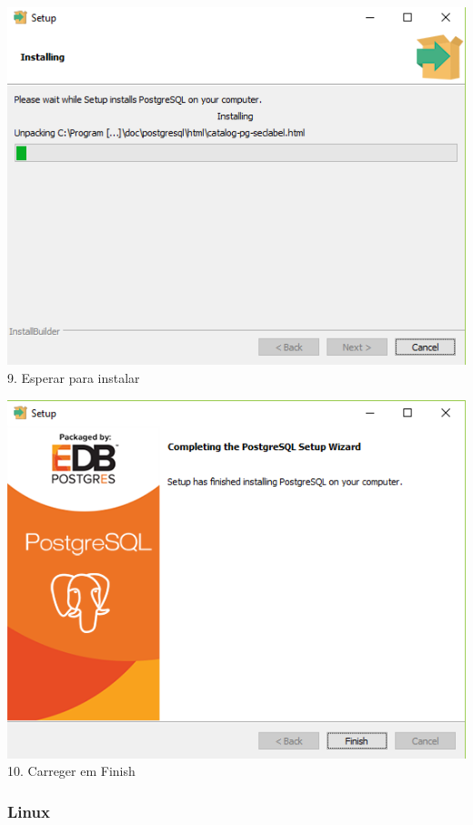 \documentclass[a4paper, 11pt]{article}
\begin{document}
\begin{minipage}{0.45\textwidth}
  \includegraphics[width=\textwidth]{Screenshot-830.png}
  9. Esperar para instalar
\end{minipage}\hfill
\begin{minipage}{0.45\textwidth}
  \includegraphics[width=\textwidth]{Screenshot-937.png}
  10. Carreger em Finish
\end{minipage}

\subsubsection{Linux}
\end{document}
